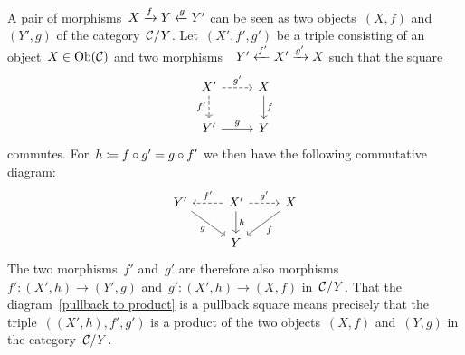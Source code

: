\begin{remark*}
  A pair of morphisms~$X \xrightarrow{f} Y \xleftarrow{g} Y'$ can be seen as two objects~$(X,f)$ and~$(Y',g)$ of the category~$\mathcal{C}/Y$.
  Let~$(X', f', g')$ be a triple consisting of an object~$X \in \operatorname{Ob}(\mathcal{C})$ and two morphisms~~$Y' \xleftarrow{f'} X' \xrightarrow{g'} X$ such that the square
  \begin{equation}
    \label{pullback to product}
    \begin{tikzcd}
        X'
        \arrow[dashed]{r}[above]{g'}
        \arrow[dashed]{d}[left]{f'}
      & X
        \arrow{d}[right]{f}
      \\
        Y'
        \arrow{r}[above]{g}
      & Y
    \end{tikzcd}
  \end{equation}
  commutes.
  For~$h \coloneqq f \circ g' = g \circ f'$ we then have the following commutative diagram:
  \[
    \begin{tikzcd}
        Y'
        \arrow{dr}[below left]{g}
      & X'
        \arrow[dashed]{l}[above]{f'}
        \arrow{d}[right]{h}
        \arrow[dashed]{r}[above]{g'}
      & X
        \arrow{dl}[below right]{f}
      \\
        {}
      & Y
      & {}
    \end{tikzcd}
  \]
  The two morphisms~$f'$ and~$g'$ are therefore also morphisms~$f' \colon (X',h) \to (Y',g)$ and~$g' \colon (X',h) \to (X,f)$ in~$\mathcal{C}/Y$.
  That the diagram~\eqref{pullback to product} is a pullback square means precisely that the triple~$((X',h), f', g')$ is a product of the two objects~$(X,f)$ and~$(Y,g)$ in the category~$\mathcal{C}/Y$.
\end{remark*}


